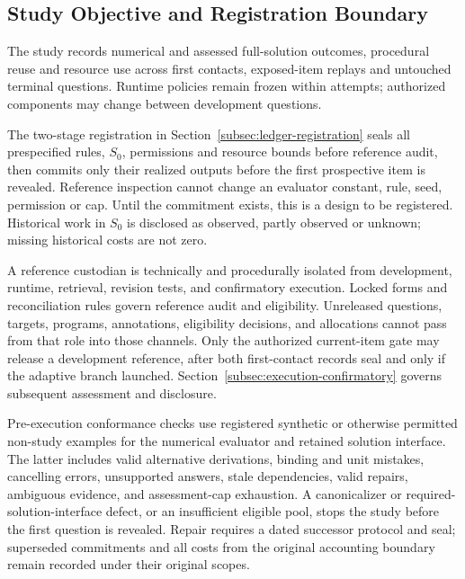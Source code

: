 \documentclass[10pt]{article} %
\providecommand{\1}{\mathbf{1}}  %
\theoremstyle{remark}
\theoremstyle{definition}
\begin{document}
\subsection{Study Objective and Registration Boundary}

\label{subsec:pilot-registration}

The study records numerical and assessed full-solution outcomes, procedural
reuse and resource use across first contacts, exposed-item replays and
untouched terminal questions. Runtime policies remain frozen within attempts;
authorized components may change between development questions.

The two-stage registration in Section~\ref{subsec:ledger-registration}
seals all prespecified rules, $S_0$, permissions and resource bounds before
reference audit, then commits only their realized outputs before the first
prospective item is revealed. Reference inspection cannot change an evaluator
constant, rule, seed, permission or cap. Until the commitment exists, this is
a design to be registered. Historical work in $S_0$ is disclosed as observed, partly observed or unknown;
missing historical costs are not zero.

A reference custodian is technically and procedurally isolated from
development, runtime, retrieval, revision tests, and confirmatory execution.
Locked forms and reconciliation rules govern reference audit and eligibility.
Unreleased questions, targets, programs, annotations, eligibility decisions,
and allocations cannot pass from that role into those channels. Only the
authorized current-item gate may release a development reference, after both
first-contact records seal and only if the adaptive branch launched.
Section~\ref{subsec:execution-confirmatory} governs subsequent assessment
and disclosure.

Pre-execution conformance checks use registered synthetic or otherwise
permitted non-study examples for the numerical evaluator and retained
solution interface. The latter includes valid alternative derivations,
binding and unit mistakes, cancelling errors, unsupported answers, stale
dependencies, valid repairs, ambiguous evidence, and assessment-cap
exhaustion. A canonicalizer or required-solution-interface defect, or an
insufficient eligible pool, stops
the study before the first question is revealed. Repair requires a dated
successor protocol and seal; superseded commitments and all costs from the
original accounting boundary remain recorded under their original scopes.
\end{document}
